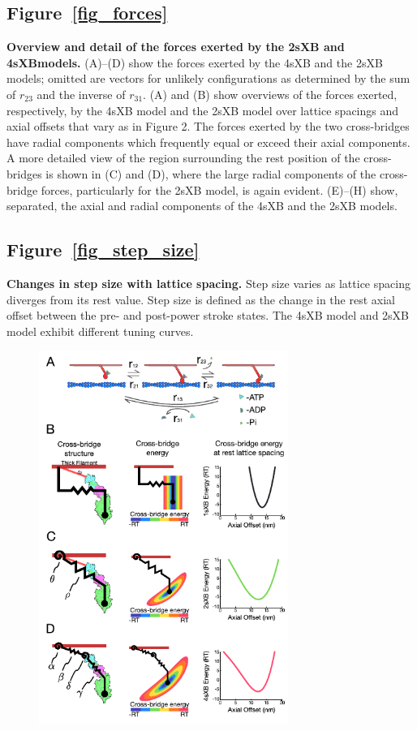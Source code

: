 \documentclass[11pt,titlepage]{article}
\begin{document}
\subsection*{Figure~\ref{fig_forces}}
    \textbf{Overview and detail of the forces exerted by the 2sXB and 4sXB\@ models.}
        (A)--(D) show the forces exerted by the 4sXB and the 2sXB models; omitted are vectors for unlikely configurations as determined by the sum of $r_{23}$ and the inverse of $r_{31}$. 
        (A) and (B) show overviews of the forces exerted, respectively, by the 4sXB model and the 2sXB model over lattice spacings and axial offsets that vary as in Figure 2. 
        The forces exerted by the two cross-bridges have radial components which frequently equal or exceed their axial components. 
        A more detailed view of the region surrounding the rest position of the cross-bridges is shown in (C) and (D), where the large radial components of the cross-bridge forces, particularly for the 2sXB model, is again evident.  (E)--(H) show, separated, the axial and radial components of the 4sXB and the 2sXB models.

\subsection*{Figure~\ref{fig_step_size}}
     \textbf{Changes in step size with lattice spacing.}
        Step size varies as lattice spacing diverges from its rest value.
        Step size is defined as the change in the rest axial offset between the pre- and post-power stroke states. 
        The 4sXB model and 2sXB model exhibit different tuning curves.



\clearpage
\begin{figure}[ht]
    \begin{center}
    \includegraphics[width=3.2in]{../imgs/Figure1.pdf}
    \caption{
        \label{fig_xb_types}
        }
    \end{center}
\end{figure}
\end{document}
